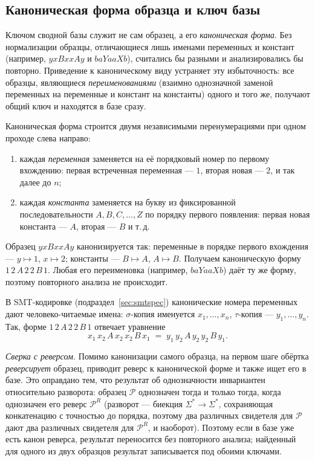 \documentclass[14pt, russian]{scrartcl}
\begin{document}
\subsection{Каноническая форма образца и ключ базы}
\label{sec:canon}

Ключом сводной базы служит не сам образец, а его \textit{каноническая форма}. Без
нормализации образцы, отличающиеся лишь именами переменных и констант (например,
$y x B x x A y$ и $b a Y a a X b$), считались бы разными и анализировались бы повторно.
Приведение к каноническому виду устраняет эту избыточность: все образцы, являющиеся
\textit{переименованиями} (взаимно однозначной заменой переменных на переменные и
констант на константы) одного и того же, получают общий ключ и находятся в базе сразу.

Каноническая форма строится двумя независимыми перенумерациями при одном проходе слева
направо:
\begin{enumerate}
\item каждая \textit{переменная} заменяется на её порядковый номер по первому вхождению:
  первая встреченная переменная --- $1$, вторая новая --- $2$, и так далее до $n$;
\item каждая \textit{константа} заменяется на букву из фиксированной последовательности
  $A, B, C, \dots, Z$ по порядку первого появления: первая новая константа --- $A$,
  вторая --- $B$ и т.\,д.
\end{enumerate}

\begin{Example}
Образец $y x B x x A y$ канонизируется так: переменные в порядке первого вхождения ---
$y\!\mapsto\!1$, $x\!\mapsto\!2$; константы --- $B\!\mapsto\!A$, $A\!\mapsto\!B$. Получаем
каноническую форму $1\,2\,A\,2\,2\,B\,1$. Любая его переименовка (например,
$b a Y a a X b$) даёт ту же форму, поэтому повторного анализа не происходит.
\end{Example}

В SMT-кодировке (подраздел~\ref{sec:smtspec}) канонические номера переменных дают
человеко-читаемые имена: $\sigma$-копия именуется $x_1, \dots, x_n$, $\tau$-копия ---
$y_1, \dots, y_n$. Так, форме $1\,2\,A\,2\,2\,B\,1$ отвечает уравнение
\[
  x_1\, x_2\, A\, x_2\, x_2\, B\, x_1 \;=\; y_1\, y_2\, A\, y_2\, y_2\, B\, y_1 .
\]

\textit{Сверка с реверсом.} Помимо канонизации самого образца, на первом шаге обёртка
\textit{реверсирует} образец, приводит реверс к канонической форме и также ищет его в
базе. Это оправдано тем, что результат об однозначности инвариантен относительно
разворота: образец $\mathcal{P}$ однозначен тогда и только тогда, когда однозначен его
реверс $\mathcal{P}^{R}$ (разворот --- биекция $\Sigma^*\!\to\!\Sigma^*$, сохраняющая
конкатенацию с точностью до порядка, поэтому два различных свидетеля для $\mathcal{P}$
дают два различных свидетеля для $\mathcal{P}^{R}$, и наоборот). Поэтому если в базе уже
есть канон реверса, результат переносится без повторного анализа; найденный для одного из
двух образцов результат записывается под обоими ключами.
\end{document}
